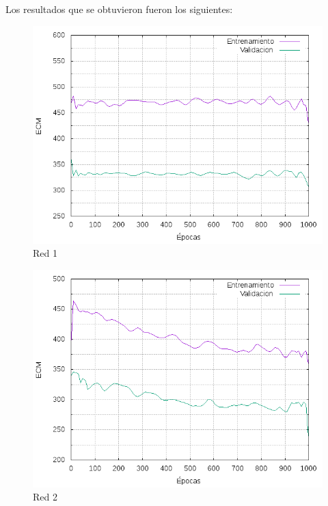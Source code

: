 Los resultados que se obtuvieron fueron los siguientes:
\begin{figure}[h!]
  \includegraphics[width=125mm]{imagenes/ej1/ex_1-1_red_11-1_errors.png}
  \caption{Red 1}
\end{figure}

\begin{figure}[h!]
  \includegraphics[width=125mm]{imagenes/ej1/ex_1-1_red_11-6-6-9-1_errors.png}
  \caption{Red 2}
\end{figure}

